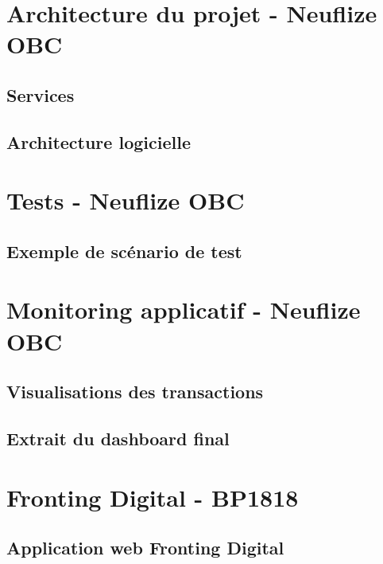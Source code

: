 \documentclass[11pt,twoside]{scrreprt}
\begin{document}
\begin{appendices}
	\chapter{Architecture du projet - Neuflize OBC}
	
		\section{Services}
		\label{a1}
		
	
		\section{Architecture logicielle}
		\label{a2}
		
	
	\chapter{Tests - Neuflize OBC}
		\section{Exemple de scénario de test}
		\label{b1}
		

	\chapter{Monitoring applicatif - Neuflize OBC}
		\section{Visualisations des transactions}
		\label{c1}
		
		\section{Extrait du dashboard final}
		\label{c2}
		
		
	\chapter{Fronting Digital - BP1818}
		\section{Application web Fronting Digital}
		\label{d1}
				
\end{appendices}


\end{document}
